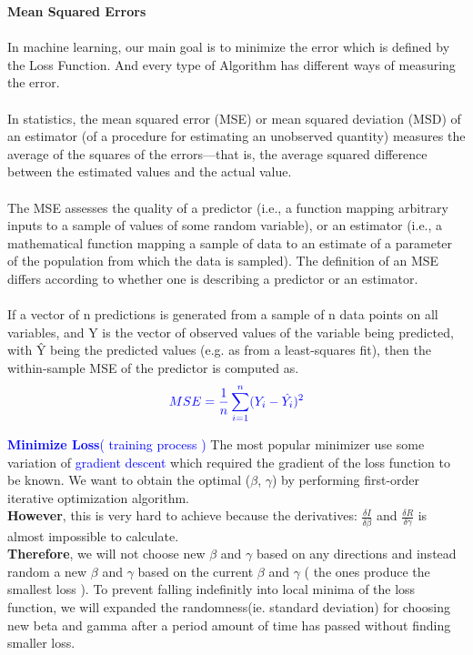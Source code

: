 \documentclass[a4paper]{article}
\begin{document}
    \textbf{Mean Squared Errors }\label{MSE} 
    \\
    \\
    \indent In machine learning, our main goal is to minimize the error which is defined by the Loss Function. And every type of Algorithm has different ways of measuring the error.
    \\
    \\
    \indent In statistics, the mean squared error (MSE) or mean squared deviation (MSD) of an estimator (of a procedure for estimating an unobserved quantity) measures the average of the squares of the errors—that is, the average squared difference between the estimated values and the actual value. 
    \\
    \\
    \indent The MSE assesses the quality of a predictor (i.e., a function mapping arbitrary inputs to a sample of values of some random variable), or an estimator (i.e., a mathematical function mapping a sample of data to an estimate of a parameter of the population from which the data is sampled). The definition of an MSE differs according to whether one is describing a predictor or an estimator. 
    \\
    \\
    \indent If a vector of n predictions is generated from a sample of n data points on all variables, and Y is the vector of observed values of the variable being predicted, with \^{Y} being the predicted values (e.g. as from a least-squares fit), then the within-sample MSE of the predictor is computed as. 
    \begin{equation*}
        \textcolor{blue}{MSE = \frac{1}{n} \sum_{i=1}^n (Y_i - \hat{Y_i})^2}
    \end{equation*}
    
    \textcolor{blue}{\textbf{Minimize Loss}( training process )}
    The most popular minimizer use some variation of \textcolor{blue}{gradient descent} which required the gradient of the loss function to be known. We want to obtain the optimal ($\beta$, $\gamma$) by performing first-order iterative optimization algorithm.
    \\
    
    \textbf{However}, this is very hard to achieve because the derivatives: $\frac{\delta I}{\delta \beta}$ and $\frac{\delta R}{\delta \gamma}$ is almost impossible to calculate.
    \\
    
    \textbf{Therefore}, we will not choose new $\beta$ and $\gamma$ based on any directions and instead random a new $\beta$ and $\gamma$ based on the current $\beta$ and $\gamma$ ( the ones produce the smallest loss ). To prevent falling indefinitly into local minima of the loss function, we will expanded the randomness(ie. standard deviation) for choosing new beta and gamma after a period amount of time has passed without finding smaller loss.
    \\
    
\end{document}
